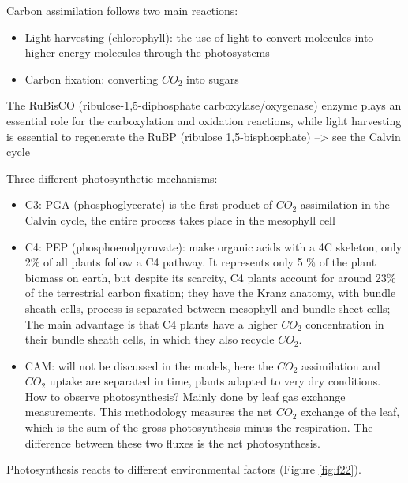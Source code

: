 \documentclass[
  12pt,
  oneside]{book}
\providecommand{\tightlist}{%
  \setlength{\itemsep}{0pt}\setlength{\parskip}{0pt}}
\begin{document}
Carbon assimilation follows two main reactions:

\begin{itemize}
\tightlist
\item
  Light harvesting (chlorophyll): the use of light to convert molecules into higher energy molecules through the photosystems
\item
  Carbon fixation: converting \(CO_2\) into sugars
\end{itemize}

The RuBisCO (ribulose-1,5-diphosphate carboxylase/oxygenase) enzyme plays an essential role for the carboxylation and oxidation reactions, while light harvesting is essential to regenerate the RuBP (ribulose 1,5-bisphosphate) --\textgreater{} see the Calvin cycle

Three different photosynthetic mechanisms:

\begin{itemize}
\tightlist
\item
  C3: PGA (phosphoglycerate) is the first product of \(CO_2\) assimilation in the Calvin cycle, the entire process takes place in the mesophyll cell
\item
  C4: PEP (phosphoenolpyruvate): make organic acids with a 4C skeleton, only 2\% of all plants follow a C4 pathway. It represents only 5 \% of the plant biomass on earth, but despite its scarcity, C4 plants account for around 23\% of the terrestrial carbon fixation; they have the Kranz anatomy, with bundle sheath cells, process is separated between mesophyll and bundle sheet cells; The main advantage is that C4 plants have a higher \(CO_2\) concentration in their bundle sheath cells, in which they also recycle \(CO_2\).
\item
  CAM: will not be discussed in the models, here the \(CO_2\) assimilation and \(CO_2\) uptake are separated in time, plants adapted to very dry conditions.
  How to observe photosynthesis? Mainly done by leaf gas exchange measurements. This methodology measures the net \(CO_2\) exchange of the leaf, which is the sum of the gross photosynthesis minus the respiration. The difference between these two fluxes is the net photosynthesis.
\end{itemize}

Photosynthesis reacts to different environmental factors (Figure \ref{fig:f22}).
\end{document}
